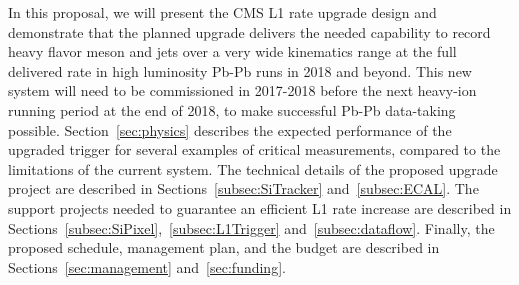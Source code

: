 In this proposal, we will present the CMS L1 rate upgrade design and demonstrate that the planned upgrade delivers the needed capability to record heavy flavor meson and jets over a very wide kinematics range at the full delivered rate in high luminosity Pb-Pb runs in 2018 and beyond. This new system will need to be commissioned in 2017-2018 before the next heavy-ion running period at the end of 2018, to make successful Pb-Pb data-taking possible. Section~\ref{sec:physics} describes the expected performance of the upgraded trigger for several examples of critical measurements, compared to the limitations of the current system. The technical details of the proposed upgrade project are described in Sections~\ref{subsec:SiTracker} and~\ref{subsec:ECAL}. The support projects needed to guarantee an efficient L1 rate increase are described in Sections~\ref{subsec:SiPixel},~\ref{subsec:L1Trigger} and~\ref{subsec:dataflow}. Finally, the proposed schedule, management plan, and the budget are described in Sections~\ref{sec:management} and~\ref{sec:funding}.

